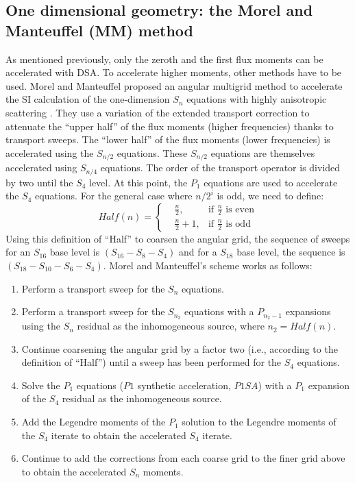 \subsection{One dimensional geometry: the Morel and Manteuffel (MM) method}
As mentioned previously, only the zeroth and the first flux moments can be
accelerated with DSA. To accelerate higher moments, other methods have to be
used. Morel and Manteuffel proposed an angular multigrid method to accelerate
the SI calculation of the one-dimension $S_n$ equations with highly
anisotropic scattering \cite{multigrid_1d}. They use a variation of the
extended transport correction \cite{lathrop} to attenuate the ``upper half''
of the flux moments (higher frequencies) thanks to transport sweeps. The
``lower half'' of the flux moments (lower frequencies) is accelerated using
the $S_{n/2}$ equations. These $S_{n/2}$ equations are themselves accelerated
using $S_{n/4}$ equations. The order of the transport operator is divided
by two until the $S_4$ level. At this point, the $P_1$ equations are used to
accelerate the $S_4$ equations. For the general case where $n/2^i$ is odd, we need
to define:
\begin{equation}
Half(n) = \left\{
\begin{aligned}
&\frac{n}{2}, &\textrm{if }\frac{n}{2}\textrm{ is even}\\
&\frac{n}{2}+1, &\textrm{if }\frac{n}{2}\textrm{ is odd}
\end{aligned}
\right.
\end{equation}
Using this definition of ``Half'' to coarsen the angular grid, the sequence of
sweeps for an $S_{16}$ base level is $(S_{16}-S_8-S_4)$ and for a $S_{18}$
base level, the sequence is $(S_{18}-S_{10}-S_6-S_4)$. Morel and Manteuffel's
scheme works as follows:
\begin{enumerate}
\item Perform a transport sweep for the $S_n$ equations.
\item Perform a transport sweep for the $S_{n_2}$ equations with a $P_{n_2-1}$
expansions using the $S_n$ residual as the inhomogeneous source, where
$n_2=Half(n)$.
\item Continue coarsening the angular grid by a factor two (i.e., according to
the definition of ``Half'') until a sweep has been performed for the $S_4$
equations.
\item Solve the $P_1$ equations ($P1$ synthetic acceleration, $P1SA$) with a
$P_1$ expansion of the $S_4$ residual as the inhomogeneous source.
\item Add the Legendre moments of the $P_1$ solution to the Legendre moments
of the $S_4$ iterate to obtain the accelerated $S_4$ iterate.
\item Continue to add the corrections from each coarse grid to the finer grid
above to obtain the accelerated $S_n$ moments.
\end{enumerate}
